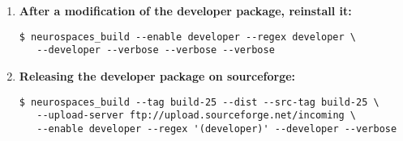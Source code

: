 \documentclass[12pt]{article}
\begin{document}
\begin{enumerate}
\item {\bf After a modification of the developer package, reinstall it:}
\begin{verbatim}
$ neurospaces_build --enable developer --regex developer \
   --developer --verbose --verbose --verbose
\end{verbatim}

\item {\bf Releasing the developer package on sourceforge:}
\begin{verbatim}
$ neurospaces_build --tag build-25 --dist --src-tag build-25 \
   --upload-server ftp://upload.sourceforge.net/incoming \
   --enable developer --regex '(developer)' --developer --verbose
\end{verbatim}

\end{enumerate}
\end{document}
